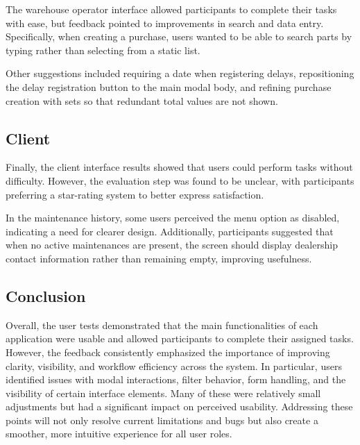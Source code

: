 The warehouse operator interface allowed participants to complete their tasks with ease, but feedback pointed to improvements in search and data entry. Specifically, when creating a purchase, users wanted to be able to search parts by typing rather than selecting from a static list.

Other suggestions included requiring a date when registering delays, repositioning the delay registration button to the main modal body, and refining purchase creation with sets so that redundant total values are not shown.

\subsection{Client}

Finally, the client interface results showed that users could perform tasks without difficulty. However, the evaluation step was found to be unclear, with participants preferring a star-rating system to better express satisfaction.

In the maintenance history, some users perceived the menu option as disabled, indicating a need for clearer design. Additionally, participants suggested that when no active maintenances are present, the screen should display dealership contact information rather than remaining empty, improving usefulness.


\subsection{Conclusion}

Overall, the user tests demonstrated that the main functionalities of each application were usable and allowed participants to complete their assigned tasks. However, the feedback consistently emphasized the importance of improving clarity, visibility, and workflow efficiency across the system. In particular, users identified issues with modal interactions, filter behavior, form handling, and the visibility of certain interface elements. Many of these were relatively small adjustments but had a significant impact on perceived usability. Addressing these points will not only resolve current limitations and bugs but also create a smoother, more intuitive experience for all user roles.

